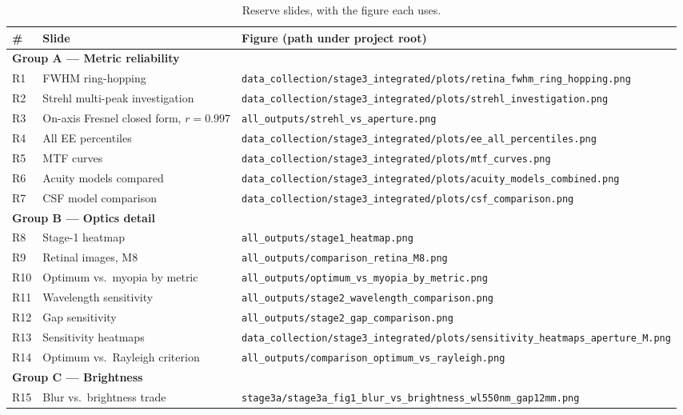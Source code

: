 \documentclass[11pt]{report}
\begin{document}
\begin{longtable}{p{0.8cm}p{5.3cm}p{8.2cm}}
\caption{Reserve slides, with the figure each uses.}\\
\toprule
\textbf{\#} & \textbf{Slide} & \textbf{Figure (path under project root)} \\
\midrule
\endhead
\multicolumn{3}{l}{\textbf{Group A --- Metric reliability}}\\
R1 & FWHM ring-hopping & \texttt{data\_collection/stage3\_integrated/plots/retina\_fwhm\_ring\_hopping.png} \\
R2 & Strehl multi-peak investigation & \texttt{data\_collection/stage3\_integrated/plots/strehl\_investigation.png} \\
R3 & On-axis Fresnel closed form, $r=0.997$ & \texttt{all\_outputs/strehl\_vs\_aperture.png} \\
R4 & All EE percentiles & \texttt{data\_collection/stage3\_integrated/plots/ee\_all\_percentiles.png} \\
R5 & MTF curves & \texttt{data\_collection/stage3\_integrated/plots/mtf\_curves.png} \\
R6 & Acuity models compared & \texttt{data\_collection/stage3\_integrated/plots/acuity\_models\_combined.png} \\
R7 & CSF model comparison & \texttt{data\_collection/stage3\_integrated/plots/csf\_comparison.png} \\
\midrule
\multicolumn{3}{l}{\textbf{Group B --- Optics detail}}\\
R8 & Stage-1 heatmap & \texttt{all\_outputs/stage1\_heatmap.png} \\
R9 & Retinal images, M8 & \texttt{all\_outputs/comparison\_retina\_M8.png} \\
R10 & Optimum vs.\ myopia by metric & \texttt{all\_outputs/optimum\_vs\_myopia\_by\_metric.png} \\
R11 & Wavelength sensitivity & \texttt{all\_outputs/stage2\_wavelength\_comparison.png} \\
R12 & Gap sensitivity & \texttt{all\_outputs/stage2\_gap\_comparison.png} \\
R13 & Sensitivity heatmaps & \texttt{data\_collection/stage3\_integrated/plots/sensitivity\_heatmaps\_aperture\_M.png} \\
R14 & Optimum vs.\ Rayleigh criterion & \texttt{all\_outputs/comparison\_optimum\_vs\_rayleigh.png} \\
\midrule
\multicolumn{3}{l}{\textbf{Group C --- Brightness}}\\
R15 & Blur vs.\ brightness trade & \texttt{stage3a/stage3a\_fig1\_blur\_vs\_brightness\_wl550nm\_gap12mm.png} \\

\end{longtable}
\end{document}
